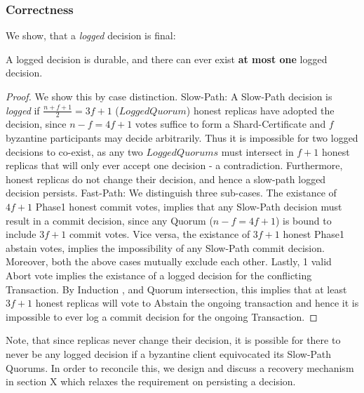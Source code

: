 \subsubsection{Correctness}
We show, that a \textit{logged} decision is final:
\begin{theorem}[Saf]
A logged decision is durable, and there can ever exist \textbf{at most one} logged decision.
\end{theorem}
\begin{proof}
We show this by case distinction. Slow-Path: A Slow-Path decision is \textit{logged} if $\frac{n+f+1}{2} = 3f+1$ ($LoggedQuorum$) honest replicas have adopted the decision, since $n-f = 4f+1$ votes suffice to form a Shard-Certificate and $f$ byzantine participants may decide arbitrarily. Thus it is impossible for two logged decisions to co-exist, as any two $LoggedQuorums$ must intersect in $f+1$ honest replicas that will only ever accept one decision - a contradiction. Furthermore, honest replicas do not change their decision, and hence a slow-path logged decision persists. Fast-Path: We distinguish three sub-cases. The existance of $4f+1$ Phase1 honest commit votes, implies that any Slow-Path decision must result in a commit decision, since any Quorum ($n-f = 4f+1$) is bound to include $3f+1$ commit votes. Vice versa, the existance of $3f+1$ honest Phase1 abstain votes, implies the impossibility of any Slow-Path commit decision. Moreover, both the above cases mutually exclude each other. Lastly, 1 valid Abort vote implies the existance of a logged decision for the conflicting Transaction. By Induction , and Quorum intersection, this implies that at least $3f+1$ honest replicas will vote to Abstain the ongoing transaction and hence it is impossible to ever log a commit decision for the ongoing Transaction.
\end{proof} 

Note, that since replicas never change their decision, it is possible for there to never be any logged decision if a byzantine client equivocated its Slow-Path Quorums. In order to reconcile this, we design and discuss a recovery mechanism in section X which relaxes the requirement on persisting a decision.  


